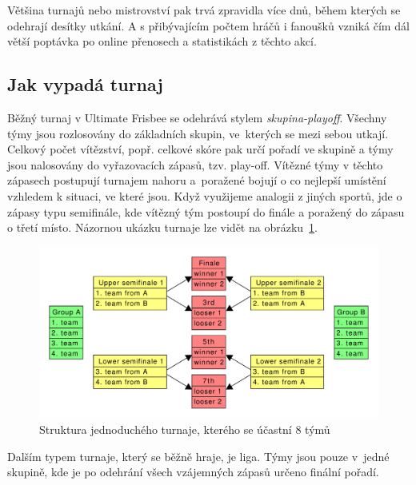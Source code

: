   Většina turnajů nebo mistrovství pak trvá zpravidla více dnů, během kterých se odehrají desítky
  utkání. A s přibývajícím počtem hráčů i fanoušků vzniká čím dál větší poptávka po online
  přenosech a statistikách z těchto akcí.

\subsection{Jak vypadá turnaj}

  Běžný turnaj v Ultimate Frisbee se odehrává stylem \textit{skupina-playoff}. Všechny týmy jsou rozlosovány do základních skupin,
  ve~kterých se mezi sebou utkají. Celkový počet vítězství, popř. celkové skóre pak určí pořadí ve skupině a týmy
  jsou nalosovány do vyřazovacích zápasů, tzv. play-off. Vítězné týmy v těchto zápasech postupují turnajem nahoru
  a~poražené bojují o co nejlepší umístění vzhledem k situaci, ve které jsou. Když využijeme analogii z jiných sportů, jde o zápasy typu semifinále,
  kde vítězný tým postoupí do finále a poražený do zápasu o třetí místo. Názornou ukázku turnaje lze vidět na obrázku~\ref{fig:tournament}.

\begin{figure}[ht!]
  \centering
  \includegraphics[width=130mm]{./images/turnaj.pdf}
  \caption{Struktura jednoduchého turnaje, kterého se účastní 8 týmů\label{overflow}}
  \label{fig:tournament}
\end{figure}


Dalším typem turnaje, který se běžně hraje, je liga. Týmy jsou pouze v~jedné skupině,
kde je po odehrání všech vzájemných zápasů určeno finální pořadí.



